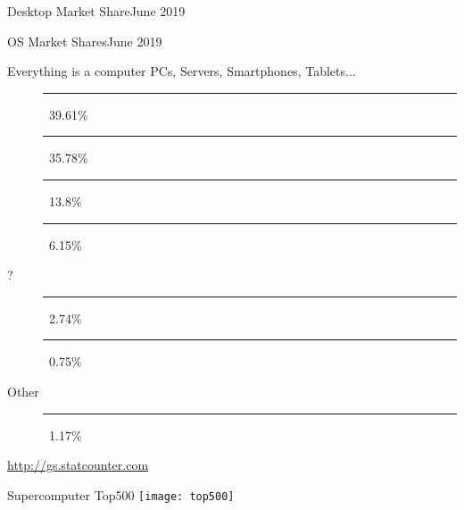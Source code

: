 \begin{frame}{Desktop Market Share}{June 2019}
\end{frame}

\begin{frame}{OS Market Shares}{June 2019}
  \begin{block}{Everything is a computer}
    PCs, Servers, Smartphones, Tablets...
    \begin{description}
    \item[\android] \textcolor{Green}{\rule{.3961\textwidth}{2mm}}\,
      39.61\%
    \item[\win] \textcolor{SkyBlue}{\rule{.3578\textwidth}{2mm}}\, 35.78\%
    \item[{\iOS}] \textcolor{orange}{\rule{.138\textwidth}{2mm}}\, 13.8\%
    \item[\apple] \textcolor{LightGray}{\rule{.0615\textwidth}{2mm}}\, 6.15\%
    \item[?] \textcolor{gray}{\rule{.0274\textwidth}{2mm}}\, 2.74\%
    \item[\linux] \rule{.0075\textwidth}{2mm}\, 0.75\%
    \item[Other] \textcolor{gray}{\rule{.0117\textwidth}{2mm}}\, 1.17\%
    \end{description}
  \end{block}
  \begin{flushright}
    \tiny \url{http://gs.statcounter.com}
  \end{flushright}
\end{frame}

\begin{frame}{Supercomputer Top500}
  \centering\texttt{[image: top500]}
\end{frame}

